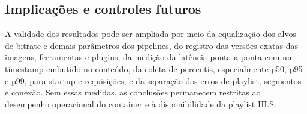 \subsection{Implicações e controles futuros}

A validade dos resultados pode ser ampliada por meio da equalização dos alvos de bitrate e demais parâmetros dos pipelines, do registro das versões exatas das imagens, ferramentas e plugins, da medição da latência ponta a ponta com um timestamp embutido no conteúdo, da coleta de percentis, especialmente p50, p95 e p99, para startup e requisições, e da separação dos erros de playlist, segmentos e conexão. Sem essas medidas, as conclusões permanecem restritas ao desempenho operacional do container e à disponibilidade da playlist HLS.
